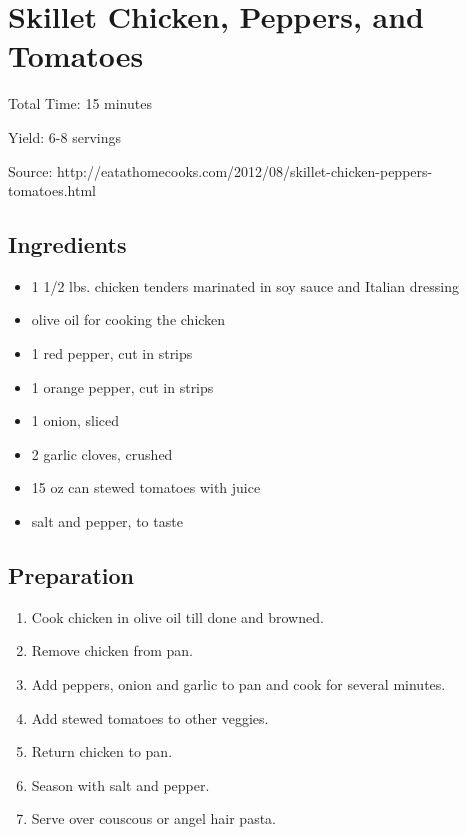 \section{Skillet Chicken, Peppers, and Tomatoes}

\begin{center}
\noindent Total Time: 15 minutes

\noindent Yield: 6-8 servings

\vspace{1em}

Source: http://eatathomecooks.com/2012/08/skillet-chicken-peppers-tomatoes.html
\end{center}

\subsection{Ingredients}
\begin{multicols}{2}
\begin{itemize}
    \item 1 1/2 lbs. chicken tenders marinated in soy sauce and Italian dressing
    \item olive oil for cooking the chicken
    \item 1 red pepper, cut in strips
    \item 1 orange pepper, cut in strips
    \item 1 onion, sliced
    \item 2 garlic cloves, crushed
    \item 15 oz can stewed tomatoes with juice
    \item salt and pepper, to taste
\end{itemize}
\end{multicols}

\subsection{Preparation}
\begin{enumerate}
    \item Cook chicken in olive oil till done and browned.
    \item Remove chicken from pan.
    \item Add peppers, onion and garlic to pan and cook for several minutes.
    \item Add stewed tomatoes to other veggies.
    \item Return chicken to pan.
    \item Season with salt and pepper.
    \item Serve over couscous or angel hair pasta.
\end{enumerate}
